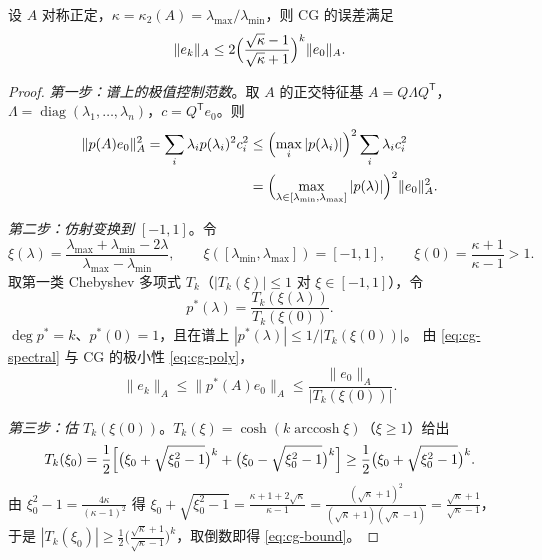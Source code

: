 \begin{theorem}
\label{thm:cg-cheb}
设 $A$ 对称正定，$\kappa=\kappa_2(A)=\lambda_{\max}/\lambda_{\min}$，则 CG 的误差满足
\begin{equation}
  \|e_k\|_A\le 2\Bigl(\frac{\sqrt\kappa-1}{\sqrt\kappa+1}\Bigr)^{k}\|e_0\|_A .
  \label{eq:cg-bound}
\end{equation}
\end{theorem}

\begin{proof}
\emph{第一步：谱上的极值控制范数}。取 $A$ 的正交特征基 $A=Q\Lambda Q^{\mathsf T}$，
$\Lambda=\operatorname{diag}(\lambda_1,\dots,\lambda_n)$，$c=Q^{\mathsf T}e_0$。则
\begin{equation}
  \begin{split}
    \|p(A)e_0\|_A^2=\sum_i\lambda_ip(\lambda_i)^2c_i^2
    &\le\Bigl(\max_i|p(\lambda_i)|\Bigr)^2\sum_i\lambda_ic_i^2\\
    &=\Bigl(\max_{\lambda\in[\lambda_{\min},\lambda_{\max}]}|p(\lambda)|\Bigr)^2\|e_0\|_A^2 .
  \end{split}
  \label{eq:cg-spectral}
\end{equation}

\emph{第二步：仿射变换到 $[-1,1]$}。令
\begin{equation}
  \xi(\lambda)=\frac{\lambda_{\max}+\lambda_{\min}-2\lambda}{\lambda_{\max}-\lambda_{\min}},
  \qquad \xi([\lambda_{\min},\lambda_{\max}])=[-1,1],\qquad
  \xi(0)=\frac{\kappa+1}{\kappa-1}>1 .
\end{equation}
取第一类 Chebyshev 多项式 $T_k$（$|T_k(\xi)|\le1$ 对 $\xi\in[-1,1]$），令
\begin{equation}
  p^\ast(\lambda)=\frac{T_k(\xi(\lambda))}{T_k(\xi(0))} .
\end{equation}
$\deg p^\ast=k$、$p^\ast(0)=1$，且在谱上 $|p^\ast(\lambda)|\le1/|T_k(\xi(0))|$。
由 \eqref{eq:cg-spectral} 与 CG 的极小性 \eqref{eq:cg-poly}，
\begin{equation}
  \|e_k\|_A\le\|p^\ast(A)e_0\|_A\le\frac{\|e_0\|_A}{|T_k(\xi(0))|} .
\end{equation}

\emph{第三步：估 $T_k(\xi(0))$}。$T_k(\xi)=\cosh(k\operatorname{arccosh}\xi)$（$\xi\ge1$）给出
\begin{equation}
  T_k(\xi_0)=\frac12\Bigl[\bigl(\xi_0+\sqrt{\xi_0^2-1}\bigr)^k+\bigl(\xi_0-\sqrt{\xi_0^2-1}\bigr)^k\Bigr]
  \ge\frac12\bigl(\xi_0+\sqrt{\xi_0^2-1}\bigr)^k .
\end{equation}
由 $\xi_0^2-1=\frac{4\kappa}{(\kappa-1)^2}$ 得
$\xi_0+\sqrt{\xi_0^2-1}=\frac{\kappa+1+2\sqrt\kappa}{\kappa-1}
=\frac{(\sqrt\kappa+1)^2}{(\sqrt\kappa+1)(\sqrt\kappa-1)}=\frac{\sqrt\kappa+1}{\sqrt\kappa-1}$，
于是 $|T_k(\xi_0)|\ge\frac12\bigl(\frac{\sqrt\kappa+1}{\sqrt\kappa-1}\bigr)^k$，取倒数即得 \eqref{eq:cg-bound}。
\end{proof}

